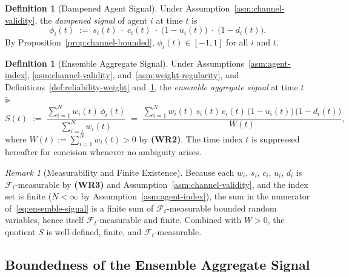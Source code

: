 \documentclass[12pt,openany]{book}
\numberwithin{equation}{chapter}
\theoremstyle{plain}
\theoremstyle{definition}
\newtheorem{definition}[theorem]{Definition}
\theoremstyle{remark}
\newtheorem{remark}[theorem]{Remark}
\numberwithin{equation}{chapter}
\theoremstyle{plain}
\begin{document}
\begin{definition}[Dampened Agent Signal]
\label{def:dampened-signal}
Under Assumption~\ref{asm:channel-validity}, the
\emph{dampened signal} of agent $i$ at time $t$ is
\begin{equation}
  \phi_i(t)
  \;:=\;
  s_i(t)\;\cdot\;c_i(t)\;\cdot\;\bigl(1 - u_i(t)\bigr)
  \;\cdot\;\bigl(1 - d_i(t)\bigr).
  \label{eq:phi-def}
\end{equation}
By Proposition~\ref{prop:channel-bounded},
$\phi_i(t) \in [-1,1]$ for all $i$ and $t$.
\end{definition}

\begin{definition}[Ensemble Aggregate Signal]
\label{def:ensemble-signal}
Under Assumptions~\ref{asm:agent-index},
\ref{asm:channel-validity}, and~\ref{asm:weight-regularity},
and Definitions~\ref{def:reliability-weight}
and~\ref{def:dampened-signal}, the \emph{ensemble aggregate
signal} at time $t$ is
\begin{equation}
  S(t)
  \;:=\;
  \frac{\displaystyle\sum_{i=1}^{N} w_i(t)\,\phi_i(t)}
       {\displaystyle\sum_{i=1}^{N} w_i(t)}
  \;=\;
  \frac{\displaystyle\sum_{i=1}^{N}
        w_i(t)\,s_i(t)\,c_i(t)\,
        \bigl(1-u_i(t)\bigr)\,\bigl(1-d_i(t)\bigr)}
       {W(t)},
  \label{eq:ensemble-signal}
\end{equation}
where $W(t) := \sum_{i=1}^{N} w_i(t) > 0$ by \textbf{(WR2)}.
The time index $t$ is suppressed hereafter for concision whenever
no ambiguity arises.
\end{definition}

\begin{remark}[Measurability and Finite Existence]
\label{rem:S-measurable}
Because each $w_i$, $s_i$, $c_i$, $u_i$, $d_i$ is
$\mathcal{F}_t$-measurable by \textbf{(WR3)} and
Assumption~\ref{asm:channel-validity}, and the index set is
finite ($N < \infty$ by Assumption~\ref{asm:agent-index}),
the sum in the numerator of~\eqref{eq:ensemble-signal} is a
finite sum of $\mathcal{F}_t$-measurable bounded random variables,
hence itself $\mathcal{F}_t$-measurable and finite.
Combined with $W > 0$, the quotient $S$ is well-defined,
finite, and $\mathcal{F}_t$-measurable.
\end{remark}

\subsection{Boundedness of the Ensemble Aggregate Signal}
\end{document}
